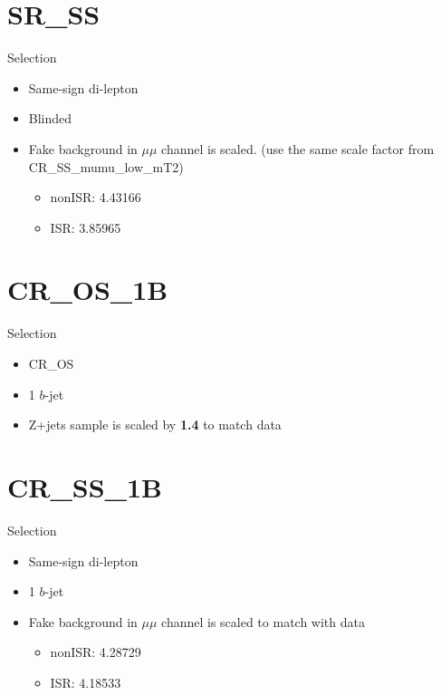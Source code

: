 \documentclass[mathserif,serif]{beamer}
\begin{document}



\section{SR\_SS}
\begin{frame}
\sectionpage
\end{frame}

\begin{frame}{Selection}
\begin{itemize}
\item Same-sign di-lepton
\item Blinded
\item Fake background in $\mu\mu$ channel is scaled. (use the same scale factor from CR\_SS\_mumu\_low\_mT2)
\begin{itemize}
\item nonISR: 4.43166
\item ISR: 3.85965
\end{itemize}
\end{itemize}
\end{frame}




\section{CR\_OS\_1B}
\begin{frame}
\sectionpage
\end{frame}

\begin{frame}{Selection}
\begin{itemize}
\item CR\_OS
\item 1 $b$-jet
\item Z+jets sample is scaled by {\bf 1.4} to match data
\end{itemize}
\end{frame}




\section{CR\_SS\_1B}
\begin{frame}
\sectionpage
\end{frame}

\begin{frame}{Selection}
\begin{itemize}
\item Same-sign di-lepton
\item 1 $b$-jet
\item Fake background in $\mu\mu$ channel is scaled to match with data
\begin{itemize}
\item nonISR: 4.28729
\item ISR: 4.18533
\end{itemize}
\end{itemize}
\end{frame}
\end{document}
